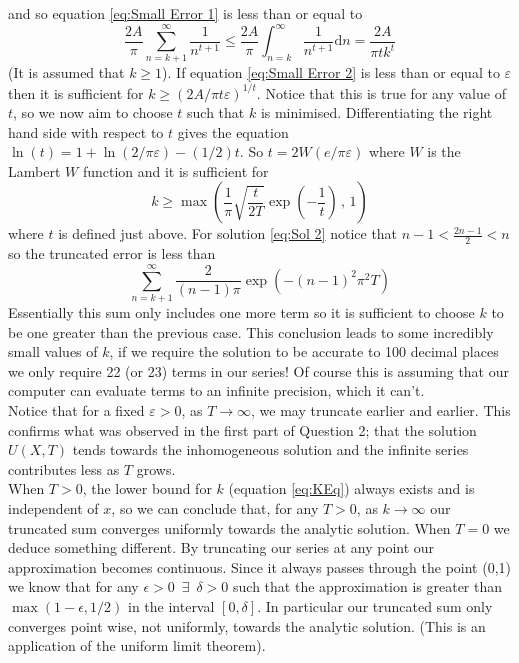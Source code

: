 \documentclass[10pt,a4paper,notitlepage]{article}
\begin{document}
and so equation \eqref{eq:Small Error 1} is less than or equal to
\begin{equation}\label{eq:Small Error 2}
\frac{2A}{\pi}\sum_{n=k+1}^{\infty}\frac{1}{n^{t+1}}\leq \frac{2A}{\pi}\int_{n=k}^{\infty}\frac{1}{n^{t+1}}\mathrm{d}n=\frac{2A}{\pi tk^{t}}
\end{equation}
(It is assumed that $k\geq 1$). If equation \eqref{eq:Small Error 2} is less than or equal to $\varepsilon$ then it is sufficient for $k\geq \left(2A/\pi t \varepsilon\right)^{1/t}$. Notice that this is true for any value of $t$, so we now aim to choose $t$ such that $k$ is minimised.  Differentiating the right hand side with respect to $t$ gives the equation $\ln\left(t\right)=1+\ln\left(2/\pi\varepsilon\right)-(1/2)t$. So $t=2W\left(e/\pi\varepsilon\right)$ where $W$ is the Lambert $W$ function and it is sufficient for
\begin{equation}\label{eq:KEq}
k\geq \max\left(\frac{1}{\pi}\sqrt{\frac{t}{2T}}\exp\left(-\frac{1}{t}\right) \, , \, 1\right)
\end{equation}
where $t$ is defined just above.
For solution \eqref{eq:Sol 2} notice that $n-1<\frac{2n-1}{2}<n$ so the truncated error is less than
\begin{equation}
\sum_{n=k+1}^{\infty}\frac{2}{\left(n-1\right)\pi}\exp\left(-\left(n-1\right)^{2}\pi^{2}T\right)
\end{equation}
Essentially this sum only includes one more term so it is sufficient to choose $k$ to be one greater than the previous case. This conclusion leads to some incredibly small values of $k$, if we require the solution to be accurate to 100 decimal places we only require 22 (or 23) terms in our series! Of course this is assuming that our computer can evaluate terms to an infinite precision, which it can't.\\

Notice that for a fixed $\varepsilon>0$, as $T\rightarrow\infty$, we may truncate earlier and earlier. This confirms what was observed in the first part of Question 2; that the solution $U(X,T)$ tends towards the inhomogeneous solution and the infinite series contributes less as $T$ grows. \\
When $T>0$, the lower bound for $k$ (equation \eqref{eq:KEq}) always exists and is independent of $x$, so we can conclude that, for any $T>0$, as $k\rightarrow\infty$ our truncated sum converges uniformly towards the analytic solution. When $T=0$ we deduce something different. By truncating our series at any point our approximation becomes continuous. Since it always passes through the point (0,1) we know that for any $\epsilon>0\,\,\,\exists\,\,\,\delta>0$ such that the approximation is greater than $\max\left(1-\epsilon,1/2\right)$ in the interval $[0,\delta]$. In particular our truncated sum only converges point wise, not uniformly, towards the analytic solution. (This is an application of the uniform limit theorem).\\
\end{document}
